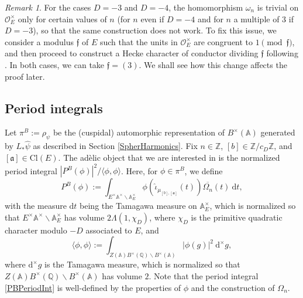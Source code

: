 \documentclass[11pt]{amsart}
\newcommand{\bigo}{\mathcal{O}}
\newcommand{\Z}{\mathbb{Z}}
\newcommand{\Q}{\mathbb{Q}}
\newcommand{\A}{\mathbb{A}}
\renewcommand{\a}{\mathfrak{a}}
\theoremstyle{definition}
\theoremstyle{remark}
\newtheorem{remark}[theorem]{Remark}
\begin{document}
\begin{remark}\label{D34HeckeCharacters}
For the cases $D=-3$ and $D=-4$, the homomorphism $\omega_n$ is trivial on $\bigo_{E}^{\times}$ only for certain values of $n$ (for $n$ even if $D=-4$ and for $n$ a multiple of $3$ if $D=-3$), so that the same construction does not work. To fix this issue, we consider a modulus $\mathfrak{f}$ of $E$ such that the units in $\bigo_{E}^{\times}$ are congruent to $1 \pmod{\mathfrak{f}}$, and then proceed to construct a Hecke character of conductor dividing $\mathfrak{f}$ following \cite[\S 6, pp. 9--10]{HeckeCharJerryShurman}. In both cases, we can take $\mathfrak{f} = (3)$. We shall see how this change affects the proof later.
\end{remark}




\subsection{Period integrals}

Let $\pi^B:=\rho_{\psi}$ be the (cuspidal) automorphic representation of $B^{\times}(\A)$ generated by $L_{*} \widehat{\psi}$ as described in Section \ref{SpherHarmonics}. Fix $n\in \Z$, $[b] \in \Z/c_D \Z$, and $[\a]\in \mathrm{Cl}(E)$. The adèlic object that we are interested in is the normalized period integral $|P^{B}(\phi)|^2 / \langle \phi, \phi \rangle$. Here, for $\phi \in \pi^{B}$, we define
\begin{equation}
    P^{B}(\phi) := \int_{E^{\times} \A^{\times} \backslash \A_{E}^{\times}} \phi(\widehat{\iota}_{\mu_{[b],[\a]}}(t)) \overline{\Omega_{n}}(t) \: \mathrm{d}t, \label{PBPeriodInt}
\end{equation}
with the measure $\mathrm{d}t$ being the Tamagawa measure on $\A_{E}^{\times}$, which is normalized so that $E^{\times} \A^{\times} \backslash \A_{E}^{\times}$ has volume $2 \Lambda(1, \chi_{D})$, where $\chi_{D}$ is the primitive quadratic character modulo $-D$ associated to $E$, and 
\begin{equation}
    \langle \phi, \phi\rangle := \int_{Z(\A) B^{\times}(\Q) \backslash B^{\times}(\A)} |\phi(g)|^2 \: \mathrm{d}^{\times}g, \label{InnProd}
\end{equation}
where $\mathrm{d}^{\times}g$ is the Tamagawa measure, which is normalized so that $Z(\A) B^{\times}(\Q) \backslash B^{\times}(\A)$ has volume $2$. Note that the period integral \eqref{PBPeriodInt} is well-defined by the properties of $\phi$ and the construction of $\Omega_n$.
\end{document}
